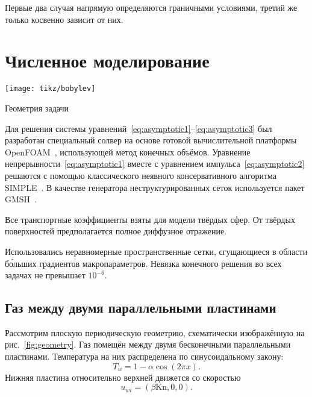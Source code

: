 \documentclass[english,russian,a4paper,10pt]{article}
\newcommand{\Kn}{\mathrm{Kn}}
\begin{document}
Первые два случая напрямую определяются граничными условиями, третий же только косвенно зависит
от них.

\section{Численное моделирование}

\begin{floatingfigure}[r]{6cm}
	\vspace{-20pt}
	\centering
	\texttt{[image: tikz/bobylev]}
	\vspace{-20pt}
	\caption{Геометрия задачи}\label{fig:geometry}
	\vspace{10pt}
\end{floatingfigure}

Для решения системы уравнений~\eqref{eq:asymptotic1}--\eqref{eq:asymptotic3} был разработан
специальный солвер на основе готовой вычислительной платформы OpenFOAM\textregistered{}~\cite{Tabor1998},
использующей метод конечных объёмов.
Уравнение непрерывности~\eqref{eq:asymptotic1} вместе с уравнением импульса~\eqref{eq:asymptotic2}
решаются с помощью классического неявного консервативного алгоритма SIMPLE~\cite{Caretto1972}.
В качестве генератора неструктурированных сеток используется пакет GMSH~\cite{Geuzaine2009}.

Все транспортные коэффициенты взяты для модели твёрдых сфер.
От твёрдых поверхностей предполагается полное диффузное отражение.

Использовались неравномерные пространственные сетки, сгущающиеся в области б\'{о}льших градиентов макропараметров.
Невязка конечного решения во всех задачах не превышает \(10^{-6}\).

\vspace{10pt}
\subsection{Газ между двумя параллельными пластинами}

Рассмотрим плоскую периодическую геометрию, схематически изображённую на рис.~\ref{fig:geometry}.
Газ помещён между двумя бесконечными параллельными пластинами.
Температура на них распределена по синусоидальному закону:
\begin{equation}
	T_w = 1-\alpha\cos(2\pi x).
\end{equation}
Нижняя пластина относительно верхней движется со скоростью
\begin{equation}
	u_{wi} = (\beta \Kn,0,0).
\end{equation}
\end{document}
